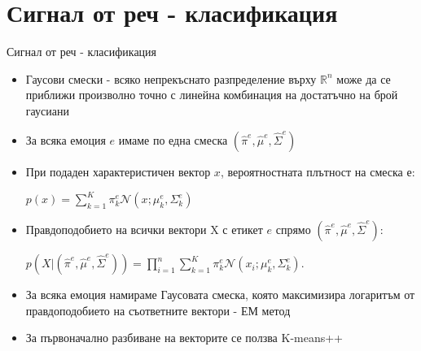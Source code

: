\documentclass[9pt]{beamer}
\begin{document}
    \section{Сигнал от реч - класификация}
    \begin{frame}[t]{Сигнал от реч - класификация}
        \begin{itemize}
            \item Гаусови смески
            \pause - всяко непрекъснато разпределение върху $\mathbb{R}^{n}$ може да се приближи произволно точно с линейна комбинация на достатъчно на брой гаусиани
            \pause
            \item За всяка емоция $e$ имаме по една смеска $(\hat{\pi}^e, \hat{\mu}^e, \hat{\Sigma}^e)$
            \pause
            \item При подаден характеристичен вектор $x$, вероятностната плътност на смеска е:
            \pause

            $p(x) = \sum\limits_{k=1}^{K} \pi_k^e \mathcal{N}(x; \mu_k^e, \Sigma_k^e)$
            \pause
            \item Правдоподобието на всички вектори X с етикет $e$ спрямо $(\hat{\pi}^e, \hat{\mu}^e, \hat{\Sigma}^e)$:
            \pause    
        
            $p(X|(\hat{\pi}^e, \hat{\mu}^e, \hat{\Sigma}^e)) = \prod\limits_{i=1}^{n} \sum\limits_{k=1}^{K} \pi_k^e \mathcal{N}(x_i; \mu_k^e, \Sigma_k^e)$.
            \pause
            \item За всяка емоция намираме Гаусовата смеска, която максимизира логаритъм от правдоподобието на съответните вектори
            \pause - ЕМ метод
            \pause
            \item За първоначално разбиване на векторите се ползва K-means++
        \end{itemize}
    \end{frame}
\end{document}
